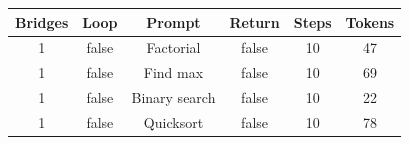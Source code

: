 \begin{table}[h]
\centering
\begin{tabular}{ |c|c|c|c|c|c| }
\hline
Bridges & Loop & Prompt & Return & Steps & Tokens \\
\hline
1 & false & Factorial & false & 10 & 47 \\
\hline
1 & false & Find max & false & 10 & 69 \\
\hline
1 & false & Binary search & false & 10 & 22 \\
\hline
1 & false & Quicksort & false & 10 & 78 \\
\hline
\end{tabular}
\end{table}
